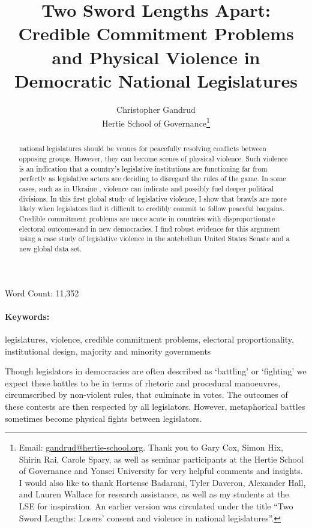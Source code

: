 \documentclass[a4paper]{article}\usepackage[]{graphicx}\usepackage[]{color}
\title{Two Sword Lengths Apart: Credible Commitment Problems and Physical Violence in Democratic National Legislatures}
\author{Christopher Gandrud \\
                Hertie School of Governance\footnote{Email: \href{mailto:gandrud@hertie-school.org}{gandrud@hertie-school.org}. Thank you to Gary Cox, Simon Hix, Shirin Rai, Carole Spary, as well as seminar participants at the Hertie School of Governance and Yonsei University for very helpful comments and insights. I would also like to thank Hortense Badarani, Tyler Daveron, Alexander Hall, and Lauren Wallace for research assistance, as well as my students at the LSE for inspiration. An earlier version was circulated under the title ``Two Sword Lengths: Losers' consent and violence in national legislatures''.}}
\begin{document}
\maketitle

\begin{center}
Word Count: 11,352
\end{center}

\begin{abstract}
 national legislatures should be venues for peacefully resolving conflicts between opposing groups. However, they can become scenes of physical violence. Such violence is an indication that a country's legislative institutions are functioning far from perfectly as legislative actors are deciding to disregard the rules of the game. In some cases, such as  in Ukraine , violence can indicate and possibly fuel deeper political divisions. In this first global study of legislative violence, I show that brawls are more likely when legislators find it difficult to credibly commit to follow peaceful bargains. Credible commitment problems are more acute in countries with disproportionate electoral outcomesand in new democracies. I find robust evidence for this argument using a case study of legislative violence in the antebellum United States Senate and a new global data set.
\end{abstract}


\paragraph{Keywords:} legislatures, violence, credible commitment problems, electoral proportionality, institutional design, majority and minority governments

\vspace{0.3cm}


Though legislators in democracies are often described as `battling' or `fighting' we expect these battles to be in terms of rhetoric and procedural manoeuvres, circumscribed by non-violent rules, that culminate in votes. The outcomes of these contests are then respected by all legislators. However, metaphorical battles sometimes become physical fights between legislators.
\end{document}
